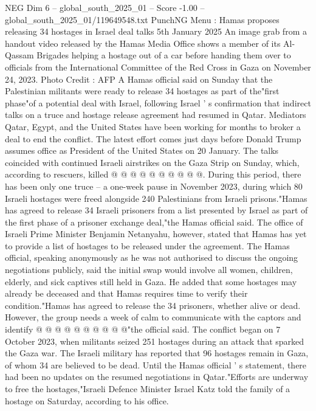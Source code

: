 \begin{textsample}{NEG Dim 6 – global\_south\_2025\_01 – Score -1.00 – global\_south\_2025\_01/119649548.txt}  \label{ex:f6_neg_013}
PunchNG Menu : Hamas proposes releasing 34 hostages in Israel deal talks 5th January 2025 An image grab from a handout video released by the Hamas Media Office shows a member of its Al-Qassam Brigades helping a hostage out of a car before handing them over to officials from the International Committee of the Red Cross in Gaza on November 24, 2023.
Photo Credit : AFP A Hamas official said on Sunday that the Palestinian militants were ready to release 34 hostages as part of the"first phase"of a potential deal with Israel, following Israel ' s confirmation that indirect talks on a truce and hostage release agreement had resumed in Qatar.
Mediators Qatar, Egypt, and the United States have been working for months to broker a deal to end the conflict.
The latest effort comes just days before Donald Trump assumes office as President of the United States on 20 January.
The talks coincided with continued Israeli airstrikes on the Gaza Strip on Sunday, which, according to rescuers, killed @ @ @ @ @ @ @ @ @ @.
During this period, there has been only one truce -- a one-week pause in November 2023, during which 80 Israeli hostages were freed alongside 240 Palestinians from Israeli prisons."Hamas has agreed to release 34 Israeli prisoners from a list presented by Israel as part of the first phase of a prisoner exchange deal,"the Hamas official said.
The office of Israeli Prime Minister Benjamin Netanyahu, however, stated that Hamas has yet to provide a list of hostages to be released under the agreement.
The Hamas official, speaking anonymously as he was not authorised to discuss the ongoing negotiations publicly, said the initial swap would involve all women, children, elderly, and sick captives still held in Gaza.
He added that some hostages may already be deceased and that Hamas requires time to verify their condition."Hamas has agreed to release the 34 prisoners, whether alive or dead.
However, the group needs a week of calm to communicate with the captors and identify @ @ @ @ @ @ @ @ @ @"the official said.
The conflict began on 7 October 2023, when militants seized 251 hostages during an attack that sparked the Gaza war.
The Israeli military has reported that 96 hostages remain in Gaza, of whom 34 are believed to be dead.
Until the Hamas official ' s statement, there had been no updates on the resumed negotiations in Qatar."Efforts are underway to free the hostages,"Israeli Defence Minister Israel Katz told the family of a hostage on Saturday, according to his office.

\end{textsample}
